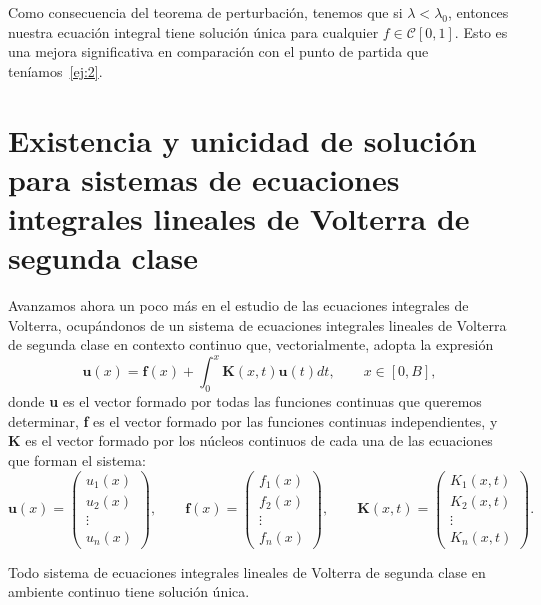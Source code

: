 \begin{ejemplo}
	Como consecuencia del teorema de perturbación, tenemos que si $\lambda < \lambda_0$, entonces nuestra ecuación integral tiene solución única para cualquier $f \in \mathcal{C}[0,1]$. Esto es una mejora significativa en comparación con el punto de partida que teníamos~\eqref{ej:2}.
\end{ejemplo}
\section{Existencia y unicidad de solución para sistemas de ecuaciones integrales lineales de Volterra de segunda clase}
Avanzamos ahora un poco más en el estudio de las ecuaciones integrales de Volterra, ocupándonos de un sistema de ecuaciones integrales lineales de Volterra de segunda clase en contexto continuo que, vectorialmente, adopta la expresión 
\begin{equation}
	\textbf{u}(x) = \textbf{f}(x) + \int_0^x \textbf{K}(x,t)\textbf{u}(t)dt, \qquad x \in [0,B],
\end{equation}
donde \textbf{u} es el vector formado por todas las funciones continuas que queremos determinar, \textbf{f} es el vector formado por las funciones continuas independientes, y \textbf{K} es el vector formado por los núcleos continuos de cada una de las ecuaciones que forman el sistema:
\begin{equation}
	\textbf{u}(x) = \begin{pmatrix}	u_1(x) \\ u_2(x) \\ \vdots \\ u_n(x)	\end{pmatrix}, \qquad \textbf{f}(x) = \begin{pmatrix}	f_1(x) \\ f_2(x) \\ \vdots \\ f_n(x)	\end{pmatrix}, \qquad \textbf{K}(x,t) = \begin{pmatrix}	K_1(x,t) \\ K_2(x,t) \\ \vdots \\ K_n(x,t)	\end{pmatrix}.
\end{equation}
\begin{corolario}
	Todo sistema de ecuaciones integrales lineales de Volterra de segunda clase en ambiente continuo tiene solución única.
\end{corolario}
